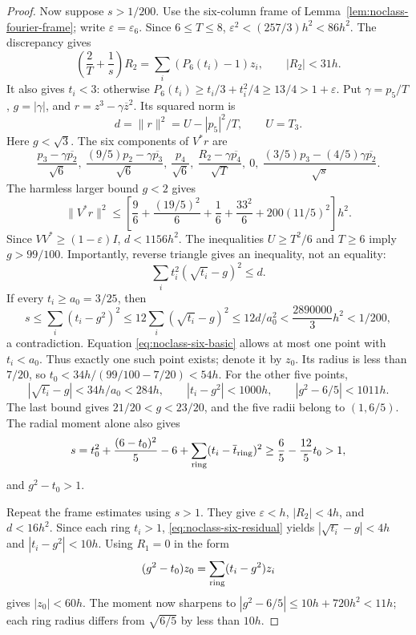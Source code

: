 \documentclass[11pt]{article}
\theoremstyle{remark}
\numberwithin{equation}{section}
\begin{document}
\begin{proof}
Now suppose $s>1/200$. Use the six-column frame of
Lemma~\ref{lem:noclass-fourier-frame}; write $\varepsilon=\varepsilon_6$.
Since $6\le T\le8$,
$\varepsilon^2<(257/3)h^2<86h^2$.
The discrepancy gives
\[
 \left(\frac2T+\frac1s\right)R_2
          =\sum_i(P_6(t_i)-1)z_i,\qquad |R_2|<31h.
\]
It also gives $t_i<3$: otherwise
$P_6(t_i)\ge t_i/3+t_i^2/4\ge13/4>1+\varepsilon$.
Put $\gamma=p_5/T$, $g=|\gamma|$, and
$r=z^3-\gamma\overline z^2$. Its squared norm is
\[
                  d=\|r\|^2=U-|p_5|^2/T,\qquad U=T_3.
\]
Here $g<\sqrt3$. The six components of $V^*r$ are
\[
 \frac{p_3-\gamma\overline{p_2}}{\sqrt6},\
 \frac{(9/5)p_2-\gamma\overline{p_3}}{\sqrt6},\
 \frac{p_4}{\sqrt6},\
 \frac{R_2-\gamma\overline{p_4}}{\sqrt T},\
 0,\
 \frac{(3/5)p_3-(4/5)\gamma\overline{p_2}}{\sqrt s}.
\]
The harmless larger bound $g<2$ gives
\[
 \|V^*r\|^2\le
 \left[\frac96+\frac{(19/5)^2}{6}+\frac16
       +\frac{33^2}{6}+200(11/5)^2\right]h^2.
\]
Since $VV^*\ge(1-\varepsilon)I$, $d<1156h^2$.
The inequalities $U\ge T^2/6$ and $T\ge6$ imply $g>99/100$.
Importantly, reverse triangle gives an inequality, not an equality:
\begin{equation}\label{eq:noclass-six-residual}
                \sum_i t_i^2(\sqrt{t_i}-g)^2\le d.
\end{equation}
If every $t_i\ge a_0=3/25$, then
\[
 s\le\sum_i(t_i-g^2)^2
 \le12\sum_i(\sqrt{t_i}-g)^2
 \le12d/a_0^2
 <\frac{2890000}{3}h^2<1/200,
\]
a contradiction. Equation \eqref{eq:noclass-six-basic} allows
at most one point with $t_i<a_0$. Thus exactly one such point
exists; denote it by $z_0$.
Its radius is less than $7/20$, so
$t_0<34h/(99/100-7/20)<54h$.
For the other five points,
\[
 |\sqrt{t_i}-g|<34h/a_0<284h,\qquad
 |t_i-g^2|<1000h,\qquad |g^2-6/5|<1011h.
\]
The last bound gives $21/20<g<23/20$, and the five radii belong
to $(1,6/5)$. The radial moment alone also gives
\[
 s=t_0^2+\frac{(6-t_0)^2}{5}-6
       +\sum_{\rm ring}(t_i-\overline t_{\rm ring})^2
 \ge\frac65-\frac{12}{5}t_0>1,
\]
and $g^2-t_0>1$.

Repeat the frame estimates using $s>1$. They give
$\varepsilon<h$, $|R_2|<4h$, and $d<16h^2$.
Since each ring $t_i>1$, \eqref{eq:noclass-six-residual} yields
$|\sqrt{t_i}-g|<4h$ and $|t_i-g^2|<10h$.
Using $R_1=0$ in the form
\[
       (g^2-t_0)z_0=\sum_{\rm ring}(t_i-g^2)z_i
\]
gives $|z_0|<60h$.
The moment now sharpens to
$|g^2-6/5|\le10h+720h^2<11h$; each ring radius differs
from $\sqrt{6/5}$ by less than $10h$.


\end{proof}
\end{document}
